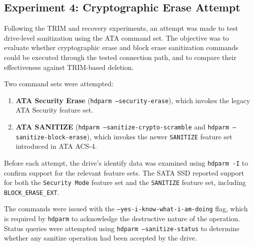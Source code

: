 \subsection{Experiment 4: Cryptographic Erase Attempt}
Following the TRIM and recovery experiments, an attempt was made to test drive-level sanitization using the ATA command set. The objective was to evaluate whether 
cryptographic erase and block erase sanitization commands could be executed through the tested connection path, and to compare their effectiveness against TRIM-based 
deletion.

Two command sets were attempted:

\begin{enumerate}
    \item \textbf{ATA Security Erase} (\texttt{hdparm --security-erase}), which invokes the legacy ATA Security feature set.
    \item \textbf{ATA SANITIZE} (\texttt{hdparm --sanitize-crypto-scramble} and \texttt{hdparm --sanitize-block-erase}), which invokes the newer \texttt{SANITIZE} 
    feature set introduced in ATA ACS-4.
\end{enumerate}

Before each attempt, the drive's identify data was examined using \texttt{hdparm -I} to confirm support for the relevant feature sets. The SATA SSD reported support for 
both the \texttt{Security Mode} feature set and the \texttt{SANITIZE} feature set, including \texttt{BLOCK\_ERASE\_EXT}.

The commands were issued with the \texttt{--yes-i-know-what-i-am-doing} flag, which is required by \texttt{hdparm} to acknowledge the destructive nature of the operation. 
Status queries were attempted using \texttt{hdparm --sanitize-status} to determine whether any sanitize operation had been accepted by the drive.
